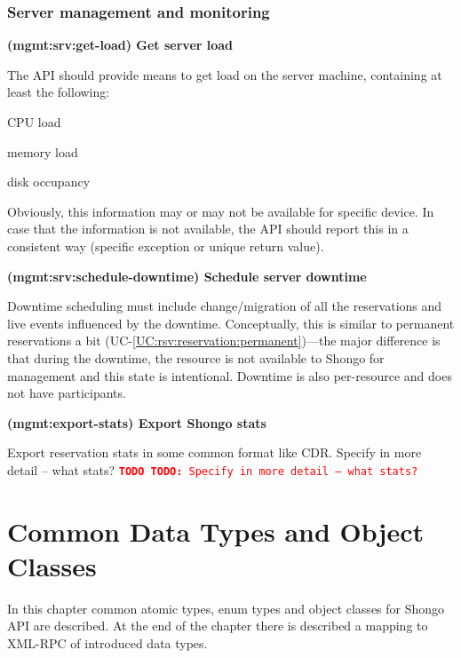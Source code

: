 \documentclass[a4paper]{report}
\makeatletter
\newcounter{UCcounter}
\newenvironment{UseCases}%
	{\begin{list}{\textbf{UC-\arabic{UCcounter}}}{\@nmbrlisttrue\def\@listctr{UCcounter}}}%
	{\end{list}}
\newcommand{\UClabel}[1]{\label{UC:#1}}
\newcommand{\UCref}[1]{UC-\ref{UC:#1}}
\newcommand{\UseCase}[2]{\item\UClabel{#2} \textbf{(#2) #1}\\ \nopagebreak}
\newcommand{\TODO}[1]{%
\def\empty{}%
\def\prvniparametr{#1}%
\ifx\prvniparametr\empty%
\begingroup\tt\textcolor{red}{\noindent\textbf{TODO}}\endgroup
\else%
\begingroup\tt\textcolor{red}{\noindent\textbf{TODO:}\ #1}\endgroup
\fi%
}
\makeatother
\begin{document}
\subsection{Server management and monitoring}

\begin{UseCases}

\UseCase{Get server load}{mgmt:srv:get-load}

The API should provide means to get load on the server machine, containing at
least the following:

\begin{compactitem}

\item CPU load

\item memory load

\item disk occupancy

\end{compactitem}

Obviously, this information may or may not be available for specific device.
In case that the information is not available, the API should report this in a
consistent way (specific exception or unique return value).


\UseCase{Schedule server downtime}{mgmt:srv:schedule-downtime}

Downtime scheduling must include change/migration of all the reservations and
live events influenced by the downtime. Conceptually, this is similar to
permanent reservations a bit (\UCref{rsv:reservation:permanent})---the major
difference is that during the downtime, the resource is not available to Shongo
for management and this state is intentional. Downtime is also per-resource and
does not have participants.

\UseCase{Export Shongo stats}{mgmt:export-stats}

Export reservation stats in some common format like CDR.
\TODO{Specify in more detail -- what stats?}

\end{UseCases}




\chapter{Common Data Types and Object Classes}

In this chapter common atomic types, enum types and object classes for Shongo API are described. At the end of the chapter there is described a mapping to XML-RPC of introduced data types.
\end{document}
